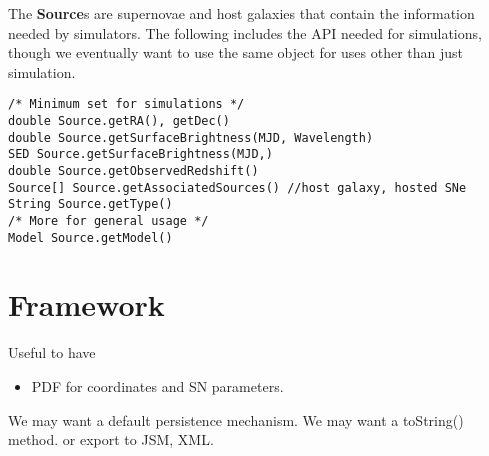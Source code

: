 \documentclass[preprint]{aastex}
\begin{document}
The {\bf Source}s are supernovae and host galaxies that contain the information
needed by simulators.  
The following includes the API needed for simulations, though we
eventually want to use the same object for uses other than just simulation.
\begin{verbatim}
/* Minimum set for simulations */
double Source.getRA(), getDec()
double Source.getSurfaceBrightness(MJD, Wavelength)
SED Source.getSurfaceBrightness(MJD,)
double Source.getObservedRedshift()
Source[] Source.getAssociatedSources() //host galaxy, hosted SNe
String Source.getType()
/* More for general usage */
Model Source.getModel()
\end{verbatim}


\section{Framework}
Useful to have
\begin{itemize}
\item PDF for coordinates and SN parameters.
\end{itemize}

We may want a default persistence mechanism.  We may want a toString() method. or export
to JSM, XML.
\end{document}
